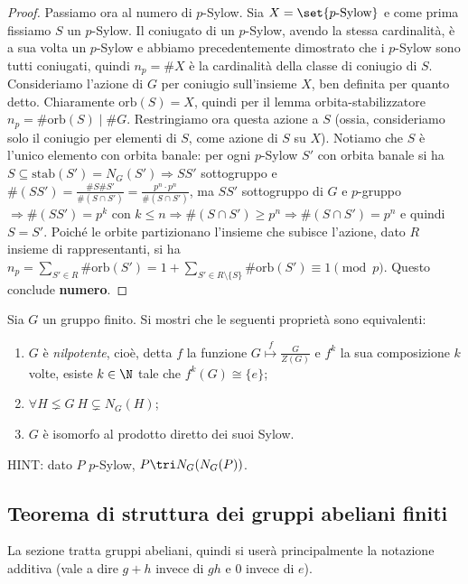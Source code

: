 \begin{proof}
    Passiamo ora al numero di $p$-Sylow. Sia $X = \set{ p\text{-Sylow}}$ e come prima fissiamo $S$ un $p$-Sylow. Il coniugato di un $p$-Sylow, avendo la stessa cardinalità, è a sua volta un $p$-Sylow e abbiamo precedentemente dimostrato che i $p$-Sylow sono tutti coniugati, quindi $n_p = \#X$ è la cardinalità della classe di coniugio di $S$. Consideriamo l'azione di $G$ per coniugio sull'insieme $X$, ben definita per quanto detto. Chiaramente $\text{orb}(S) = X$, quindi per il lemma orbita-stabilizzatore $n_p = \#\text{orb}(S) \mid \#G$. Restringiamo ora questa azione a $S$ (ossia, consideriamo solo il coniugio per elementi di $S$, come azione di $S$ su $X$). Notiamo che $S$ è l'unico elemento con orbita banale: per ogni $p$-Sylow $S'$ con orbita banale si ha $S \subseteq \text{stab}(S') = N_G(S') \Rightarrow SS'$ sottogruppo e $\#(SS') = \frac{\#S \#S'}{\#(S \cap S')} = \frac{p^n \cdot p^n}{\#(S \cap S')}$, ma $SS'$ sottogruppo di $G$ e $p$-gruppo $\Rightarrow \#(SS') = p^k$ con $k\leq n \Rightarrow \#(S\cap S') \geq p^n \Rightarrow \#(S\cap S') = p^n$ e quindi $S = S'$. Poiché le orbite partizionano l'insieme che subisce l'azione, dato $R$ insieme di rappresentanti, si ha $n_p = \sum_{S' \in R} \#\text{orb}(S') = 1 + \sum_{S' \in R\setminus\{S\}} \#\text{orb}(S') \equiv 1 \pmod{p}$. Questo conclude \textbf{numero}.
\end{proof}

\begin{exercise}
    Sia $G$ un gruppo finito. Si mostri che le seguenti proprietà sono equivalenti:
    \begin{enumerate}[label=$(\roman*)$]
        \item $G$ è \emph{nilpotente}, cioè, detta $f$ la funzione $G \overset{f}{\mapsto} \frac{G}{Z(G)}$ e $f^{k}$ la sua composizione $k$ volte, esiste $k \in \N$ tale che $f^k(G) \cong \{e\}$;
        \item $\forall H \lneq G \ H \subsetneq N_G(H)$;
        \item $G$ è isomorfo al prodotto diretto dei suoi Sylow.
    \end{enumerate}
    \tiny{HINT: dato $P$ $p$-Sylow, $P \tri N_G(N_G(P))$.}
\end{exercise}

\subsection{Teorema di struttura dei gruppi abeliani finiti}
La sezione tratta gruppi abeliani, quindi si userà principalmente la notazione additiva (vale a dire $g+h$ invece di $gh$ e $0$ invece di $e$).

